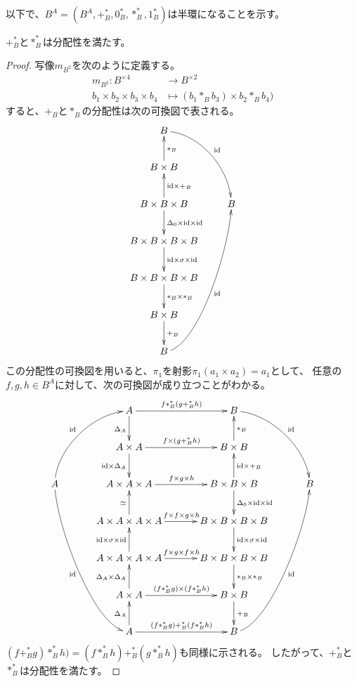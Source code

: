 以下で、$B^A=(B^A,+_B^*,0_B^*,*_B^*,1_B^*)$は半環になることを示す。

\begin{proposition}[分配性] %
$+_B^*$と$*_B^*$は分配性を満たす。
\end{proposition} %
\begin{proof} %
写像$m_{B^2}$を次のように定義する。
\begin{equation*}\begin{split} %
	m_{B^2}: B^{\times4} &\to B^{\times2} \\
		b_1 \times b_2 \times b_3 \times b_4 &\mapsto (b_1 *_B b_3) \times b_2 *_B b_4) 
\end{split}\end{equation*} %
すると、$+_B$と$*_B$の分配性は次の可換図で表される。
\begin{equation}\xymatrix{ %
	B \ar@(r,u)[rdd]^{\myid} \\
	B\times B \ar[u]_{*_B} \\
	B\times B\times B \ar[u]_{\myid\times +_B} \ar[d]^{\Delta_0\times \myid\times \myid} & B \\
	B\times B\times B\times B \ar[d]^{\myid\times \sigma\times \myid} \\
	B\times B\times B\times B \ar[d]^{*_B\times *_B} \\
	B\times B \ar[d]^{+_B} \\
	B \ar@(r,d)[ruuuu]_{\myid} \\
}\end{equation} %
この分配性の可換図を用いると、$\pi_1$を射影$\pi_1(a_1\times a_2)=a_1$として、
任意の$f,g,h\in B^A$に対して、次の可換図が成り立つことがわかる。
\begin{equation}\xymatrix@C+2ex{ %
	& A \ar[d]_{\Delta_A} \ar[r]^{f *_B^* (g +_B^* h)}
	& B \ar@(r,u)[rdd]^{\myid} \\
	& A\times A \ar[d]_{\myid\times \Delta_A} \ar[r]^{f\times (g +_B^* h)}
	& B\times B \ar[u]_{*_B} \\
	A \ar@(u,l)[ruu]^{\myid} \ar@(d,l)[rdddd]_{\myid}
	& A\times A\times A \ar[r]^{f\times g\times h}
	& B\times B\times B \ar[u]_{\myid\times +_B} \ar[d]^{\Delta_0\times \myid\times \myid}
	& B \\
	& A\times A\times A\times A \ar[u]^{\simeq} \ar[r]^{f\times f\times g\times h}
	& B\times B\times B\times B \ar[d]^{\myid\times \sigma\times \myid} \\
	& A\times A\times A\times A \ar[u]^{\myid\times \sigma\times \myid} \ar[r]^{f\times g\times f\times h}
	& B\times B\times B\times B \ar[d]^{*_B\times *_B} \\
	& A\times A \ar[u]^{\Delta_A\times \Delta_A} \ar[r]^{(f *_B^* g)\times (f *_B^* h)}
	& B\times B \ar[d]^{+_B} \\
	& A \ar[u]^{\Delta_A} \ar[r]^{(f *_B^* g) +_B^* (f *_B^* h)}
	& B \ar@(r,d)[ruuuu]_{\myid} \\
}\end{equation} %
$(f +_B^* g) *_B^* h)=(f *_B^* h) +_B^* (g *_B^* h)$も同様に示される。
したがって、$+_B^*$と$*_B^*$は分配性を満たす。
\end{proof} %

